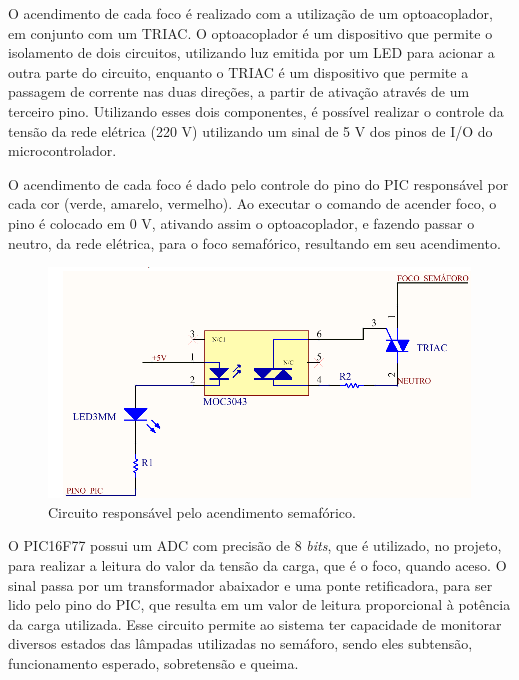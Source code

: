 O acendimento de cada foco é realizado com a utilização de um optoacoplador, em conjunto com um \ac{TRIAC}. O optoacoplador é um dispositivo que permite o isolamento de dois circuitos, utilizando luz emitida por um \ac{LED} para acionar a outra parte do circuito, 
enquanto o \ac{TRIAC} é um dispositivo que permite a passagem de corrente nas duas direções, a partir de ativação através de um terceiro pino. 
Utilizando esses dois componentes, é possível realizar o controle da tensão da rede elétrica (220 V) utilizando um sinal de 5 V dos pinos de \ac{I/O} do microcontrolador.

O acendimento de cada foco é dado pelo controle do pino do PIC responsável por cada cor (verde, amarelo, vermelho). Ao executar o comando de acender foco, o pino é colocado em 0 V, ativando assim o optoacoplador, e fazendo passar o neutro, da rede elétrica, para o foco semafórico, resultando em seu acendimento.

\begin{figure}[ht]
    \begin{center}
    \includegraphics{figuras/moc_triac.PNG}
    \end{center}
    \caption[Acendimento semafórico]{Circuito responsável pelo acendimento semafórico.}
    \label{moc_triac}
\end{figure}

O PIC16F77 possui um \ac{ADC} com precisão de 8 \textit{bits}, que é utilizado, no projeto, para realizar a leitura do valor da tensão da carga, que é o foco, quando aceso. O sinal passa por um transformador abaixador e uma ponte retificadora, para ser lido pelo pino do PIC, que resulta em um valor de leitura proporcional à potência da carga utilizada. Esse circuito permite ao sistema ter capacidade de monitorar diversos estados das lâmpadas utilizadas no semáforo, sendo eles subtensão, funcionamento esperado, sobretensão e queima.

